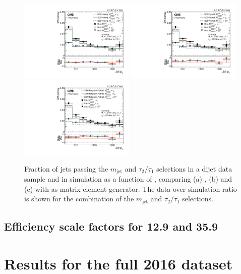 \begin{figure}[htbp]
\centering
\includegraphics[width=0.49\textwidth]{figures/vtagging/JME-16-003/BoostedW/BkgEff_DataMC_herwig_pT.pdf}
\includegraphics[width=0.49\textwidth]{figures/vtagging/JME-16-003/BoostedW/BkgEff_DataMC_Pythia8_pT.pdf}\\
\includegraphics[width=0.49\textwidth]{figures/vtagging/JME-16-003/BoostedW/BkgEff_DataMC_Pythia8Madgraph_pT.pdf}
\caption{ 
Fraction of jets passing the $m_{\mathrm{jet}}$ and $\tau_2/\tau_1$ selections in a dijet data sample and in
simulation as a function of \pt, comparing (a) \HERWIG{++}, (b)  and (c)  with \MADGRAPH as matrix-element generator.
The data over simulation ratio is shown for the combination of the $m_{\mathrm{jet}}$ and $\tau_2/\tau_1$ selections.}
\label{fig:searchII:fakerate}
\end{figure}

\subsection{Efficiency scale factors for 12.9 and 35.9 \fbinv} 
\label{sec:searchII:wtagsfana}
\section{Results for the full 2016 dataset}   
\label{sec:searchII:brg17001res}

